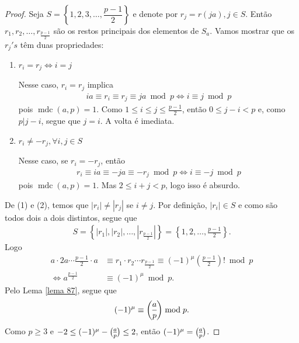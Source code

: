 \documentclass[a4paper,11pt,twoside, leqno]{article}
\DeclareMathOperator{\mdc}{mdc}
\newcommand{\genlegendre}[4]{%
	\genfrac{(}{)}{}{#1}{#3}{#4}%
	\if\relax\detokenize{#2}\relax\else_{\!#2}\fi
}
\newcommand{\legendre}[3][]{\genlegendre{}{#1}{#2}{#3}}
\theoremstyle{definition}
\begin{document}
\begin{proof}
	Seja $S = \left\{ 1,2,3,\dots,\dfrac{p-1}{2} \right\}$ e denote por $r_j = r(ja), j\in S$. Então $r_1, r_2, \dots, r_{\frac{p-1}{2}}$ são os restos principais dos elementos de $S_a$. Vamos mostrar que os $r_j's$ têm duas propriedades:
	\begin{enumerate}[(1)]
		\item $r_i=r_j\Longleftrightarrow i=j$
		\par Nesse caso, $r_i = r_j$ implica
		\begin{align*}
		ia\equiv r_i\equiv r_j\equiv ja\bmod p \Longleftrightarrow i\equiv j\bmod p
		\end{align*}
		pois $\mdc(a,p) = 1$. Como $\displaystyle{1\leq i\leq j\leq\frac{p-1}{2}}$, então $0\leq j-i<p$ e, como $p|j-i$, segue que $j=i$. A volta é imediata.
		\item $r_i\neq -r_j, \forall i,j\in S$
		\par Nesse caso, se $r_i = -r_j$, então 
		\begin{align*}
		r_i\equiv ia\equiv -ja\equiv -r_j\bmod p\Longleftrightarrow i\equiv -j\bmod p
		\end{align*}
		pois $\mdc(a,p) = 1$. Mas $2\leq i+j<p$, logo isso é absurdo.
	\end{enumerate}
De (1) e (2), temos que $|r_i|\neq |r_j|$ se $i\neq j$. Por definição, $|r_i|\in S$ e como são todos dois a dois distintos, segue que
\begin{align*}
S = \left\{ |r_1|, |r_2|, \dots, |r_{\frac{p-1}{2}}| \right\} = \left\{ 1,2,\dots,\frac{p-1}{2} \right\}.
\end{align*}
Logo 
\begin{align*}
a\cdot 2a\cdots \frac{p-1}{2}\cdot a &\equiv r_1\cdot r_2\cdots r_{\frac{p-1}{2}}\equiv (-1)^{\mu}\left( \frac{p-1}{2} \right)!\bmod p \\
\Longleftrightarrow a^{\frac{p-1}{2}}&\equiv (-1)^{\mu}\bmod p.
\end{align*} 
Pelo Lema \eqref{lema 87}, segue que 
\begin{align*}
(-1)^{\mu}\equiv \legendre[]{a}{p}\bmod p.
\end{align*}
Como $p\geq 3$ e $-2\leq (-1)^{\mu} - \legendre[]{a}{p}\leq 2$, então $(-1)^{\mu} = \legendre[]{a}{p}$.
\end{proof}
\end{document}
